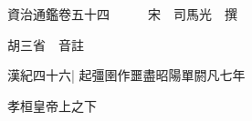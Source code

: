 






























































資治通鑑卷五十四　　　宋　司馬光　撰

胡三省　音註

漢紀四十六|{
	起彊圉作噩盡昭陽單閼凡七年}


孝桓皇帝上之下

